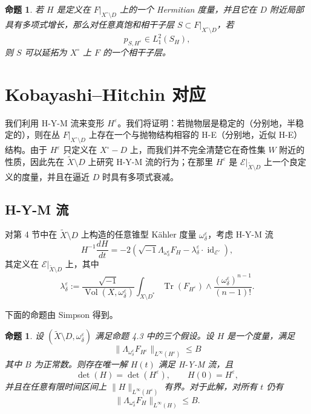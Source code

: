 \documentclass[12pt,a4paper]{article}
\newtheorem{proposition}[theorem]{命题}
\newcommand{\Tr}{\operatorname{Tr}}
\newcommand{\Vol}{\operatorname{Vol}}
\newcommand{\Id}{\operatorname{id}}
\begin{document}
\begin{proposition}
若 \(H\) 是定义在 \(F|_{X^\circ\setminus D}\) 上的一个 Hermitian 度量，并且它在 \(D\) 附近局部具有多项式增长，那么对任意真饱和相干子层 \(S\subset F|_{X^\circ\setminus D}\)，若
\[
p_{S,H^\varepsilon}\in L_1^2(S_H),
\]
则 \(S\) 可以延拓为 \(X^\circ\) 上 \(F\) 的一个相干子层。
\end{proposition}

\section{Kobayashi--Hitchin 对应}

我们利用 H-Y-M 流来变形 \(H^\varepsilon\)。我们将证明：若抛物层是稳定的（分别地，半稳定的），则在丛 \(F|_{X^\circ\setminus D}\) 上存在一个与抛物结构相容的 H-E（分别地，近似 H-E）结构。由于 \(H^\varepsilon\) 只定义在 \(X^\circ-D\) 上，而我们并不完全清楚它在奇性集 \(W\) 附近的性质，因此先在 \(\widetilde X\setminus D\) 上研究 H-Y-M 流的行为；在那里 \(H^\varepsilon\) 是 \(\mathcal E|_{\widetilde X\setminus D}\) 上一个良定义的度量，并且在逼近 \(D\) 时具有多项式衰减。

\subsection{H-Y-M 流}

对第 4 节中在 \(\widetilde X\setminus D\) 上构造的任意锥型 Kähler 度量 \(\omega^\varepsilon_\delta\)，考虑 H-Y-M 流
\[
H^{-1}\frac{dH}{dt}
=
-2\left(\sqrt{-1}\Lambda_{\omega^\varepsilon_\delta}F_H-\lambda^\varepsilon_\delta\cdot \Id_{\mathcal E'}\right), \tag{22}
\]
其定义在 \(\mathcal E|_{\widetilde X\setminus D}\) 上，其中
\[
\lambda^\varepsilon_\delta
:=
\frac{\sqrt{-1}}{\Vol(X,\omega^\varepsilon_\delta)}
\int_{X\setminus D^*}
\Tr(F_{H^\varepsilon})\wedge \frac{(\omega^\varepsilon_\delta)^{n-1}}{(n-1)!}.
\]

下面的命题由 Simpson \cite{SimpsonConstruct} 得到。

\begin{proposition}
设 \((\widetilde X\setminus D,\omega^\varepsilon_\delta)\) 满足命题 4.3 中的三个假设。设 \(H\) 是一个度量，满足
\[
\|\Lambda_{\omega^\varepsilon_\delta}F_{H^\varepsilon}\|_{L^\infty(H^\varepsilon)}\le B
\]
其中 \(B\) 为正常数。则存在唯一解 \(H(t)\) 满足 H-Y-M 流，且
\[
\det(H)=\det(H^\varepsilon),\qquad H(0)=H^\varepsilon,
\]
并且在任意有限时间区间上 \(\|H\|_{L^\infty(H^\varepsilon)}\) 有界。对于此解，对所有 \(t\) 仍有
\[
\|\Lambda_{\omega^\varepsilon_\delta}F_H\|_{L^\infty(H)}\le B.
\]
\end{proposition}
\end{document}
